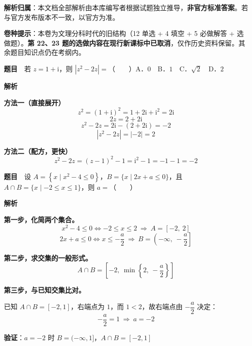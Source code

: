 

\begin{gknotice}
\textbf{解析归属}：本文档全部解析由本库编写者根据试题独立推导，\textbf{非官方标准答案}。若与官方发布版本不一致，以官方为准。

\textbf{ 卷种提示}：本卷为文理分科时代的旧结构（12 单选 + 4 填空 + 5 必做解答 + 选做题）。\textbf{第 22、23 题的选做内容在现行新课标中已取消}，仅作历史资料保留。其余题目知识点仍在考纲内。
\end{gknotice}

\par\medskip



\textbf{题目}　若 $z=1+\mathrm i$，则 $\left|z^{2}-2z\right|=$（　　）A．$0$　B．$1$　C．$\sqrt2$　D．$2$

\textbf{解析}

\textbf{方法一（直接展开）}
\[z^{2}=(1+\mathrm i)^{2}=1+2\mathrm i+\mathrm i^{2}=2\mathrm i\]
\[2z=2+2\mathrm i\]
\[z^{2}-2z=2\mathrm i-(2+2\mathrm i)=-2\]
\[\left|z^{2}-2z\right|=|-2|=2\]

\textbf{方法二（配方，更快）}
\[z^{2}-2z=(z-1)^{2}-1=\mathrm i^{2}-1=-1-1=-2\]


\par\medskip


\textbf{题目}　设 $A=\left\{x\mid x^{2}-4\le0\right\}$，$B=\{x\mid2x+a\le0\}$，且 $A\cap B=\{x\mid-2\le x\le1\}$，则 $a=$（　　）

\textbf{解析}

\textbf{第一步，化简两个集合。}
\[x^{2}-4\le0\iff-2\le x\le2\ \Longrightarrow\ A=[-2,\ 2]\]
\[2x+a\le0\iff x\le-\frac a2\ \Longrightarrow\ B=\left(-\infty,\ -\frac a2\right]\]

\textbf{第二步，求交集的一般形式。}
\[A\cap B=\left[-2,\ \min\left\{2,\ -\frac a2\right\}\right]\]

\textbf{第三步，与已知交集比对。}

已知 $A\cap B=[-2,1]$，右端点为 $1$，而 $1<2$，故右端点由 $-\dfrac a2$ 决定：
\[-\frac a2=1\ \Longrightarrow\ a=-2\]

\textbf{验证}：$a=-2$ 时 $B=(-\infty,1]$，$A\cap B=[-2,1]$ 


